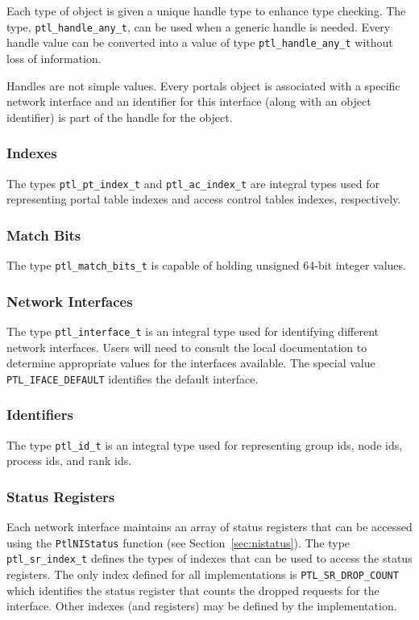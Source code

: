 \documentclass{sand-report}
\begin{document}
Each type of object is given a unique handle type to enhance type
checking.  The type, \texttt{ptl_handle_any_t}, can be used when a
generic handle is needed.  Every handle value can be converted into a
value of type \texttt{ptl_handle_any_t} without loss of information.

Handles are not simple values.  Every portals object is associated
with a specific network interface and an identifier for this interface
(along with an object identifier) is part of the handle for the
object.

\subsubsection{Indexes}\label{sec:index-type}
The types \texttt{ptl_pt_index_t} and \texttt{ptl_ac_index_t} are
integral types used for representing portal table indexes and access
control tables indexes, respectively.

\subsubsection{Match Bits}\label{sec:mb-type}
The type \texttt{ptl_match_bits_t} is capable of holding unsigned
64-bit integer values.

\subsubsection{Network Interfaces}\label{sec:ni-type}
The type \texttt{ptl_interface_t} is an integral type used for
identifying different network interfaces.  Users will need to consult
the local documentation to determine appropriate values for the
interfaces available.  The special value \texttt{PTL_IFACE_DEFAULT}
identifies the default interface.

\subsubsection{Identifiers}\label{sec:id-type}
The type \texttt{ptl_id_t} is an integral type used for representing
group ids, node ids, process ids, and rank ids.

\subsubsection{Status Registers}\label{sec:stat-type}
Each network interface maintains an array of status registers that can
be accessed using the \texttt{PtlNIStatus} function (see
Section~\ref{sec:nistatus}).  The type \texttt{ptl_sr_index_t} defines
the types of indexes that can be used to access the status registers.
The only index defined for all implementations is
\texttt{PTL_SR_DROP_COUNT} which identifies the status register that
counts the dropped requests for the interface.  Other indexes (and
registers) may be defined by the implementation.
\end{document}
